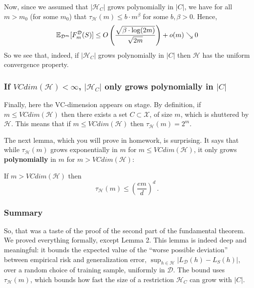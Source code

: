 \documentclass[11pt]{article}
\newcommand{\Dc}{\mathcal{D}}
\newcommand{\Xc}{\mathcal{X}}
\newcommand{\Hc}{\mathcal{H}}
\begin{document}
Now, since we assumed that $|\Hc_C|$ grows polynomially in $|C|$, 
we have for all $m>m_0$ (for some $m_0$) that  $\tau_\Hc(m) \leq b\cdot m^\beta$
for some $b,\beta>0$. Hence,
\[
  \E_{\Dc^m} [F_m^\Dc(S)] \leq O\left(\frac{ \sqrt{\beta\cdot\log(2m)}} {\sqrt{2m}}\right) + o(m) \searrow 0
\]
So we see that, indeed, if $|\Hc_C|$ grows polynomially in $|C|$ then
$\Hc$ has the uniform convergence property.

\subsubsection{If $VCdim(\Hc)<\infty$,
$|\Hc_C|$ only grows polynomially in $|C|$}

Finally, here the VC-dimension appears on stage. 
By definition, if $m\leq VCdim(\Hc)$ then there exists a set $C\subset \Xc$, of
size $m$, which is shuttered by $\Hc$. This means that if $m\leq VCdim(\Hc)$
then $\tau_\Hc(m) = 2^m$. 

The next lemma, which you will prove in
homework, is surprising. It says that
while $\tau_\Hc(m)$ grows exponentially in $m$ for $m\leq
VCdim(\Hc)$, it only grows {\bf polynomially} in $m$ for $m>VCdim(\Hc)$:

\begin{lemma} \label{perles:lem} 
    If $m>VCdim(\Hc)$ then
    \[
        \tau_\Hc(m) \leq \left( \frac{em}{d} \right)^d\,.
    \]
\end{lemma}

\subsubsection{Summary}

So, that was a taste of the  proof of the second part of the fundamental
theorem. We proved everything formally, except Lemma 2. 
 This lemma is indeed deep and meaningful: it bounds the
expected value of the ``worse possible deviation''  between empirical risk 
and generalization error, 
$\sup_{h\in\Hc} \Big| L_\Dc(h) - L_S(h) \Big|$, over a random choice of training
sample, uniformly in $\Dc$. The bound uses $\tau_\Hc(m)$, which bounds how
fast the size of a restriction $\Hc_C$ can grow with $|C|$.
\end{document}

